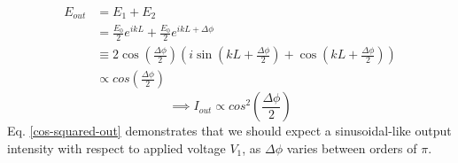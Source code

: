 \documentclass[12pt,a4paper]{report}
\begin{document}
\vspace{-0.5cm}
\begin{align*}
    E_{out} &= E_{1} + E_{2}\\
    &= \frac{E_0}{2}e^{ikL} + \frac{E_0}{2}e^{ikL + \Delta\phi} \\
    &\equiv 2\cos{\left(\frac{\Delta\phi}{2}\right)}\left(i\sin{\left(kL + \frac{\Delta\phi}{2}\right)}+\cos{\left(kL + \frac{\Delta\phi}{2}\right)}\right) \\
    &\propto cos{\left(\frac{\Delta\phi}{2}\right)}
\end{align*}
\begin{equation}
    \implies I_{out} \propto cos^2{\left(\frac{\Delta\phi}{2}\right)}
    \label{cos-squared-out}
\end{equation}
Eq. \ref{cos-squared-out} demonstrates that we should expect a sinusoidal-like output intensity with respect to applied voltage $V_1$, as $\Delta\phi$ varies between orders of $\pi$. 
\end{document}
